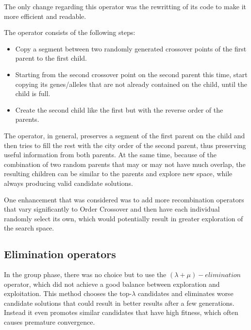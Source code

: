 \documentclass[a4paper,10pt]{article}
\newcommand{\ReplaceMe}[1]{{\color{blue}#1}}
\begin{document}
The only change regarding this operator was the rewritting of its code to make it more efficient and readable.

The operator consists of the following steps:
\begin{itemize}
\item Copy a segment between two randomly generated crossover points of the first parent to the first child.
\item Starting from the second crossover point on the second parent this time, start copying its genes/alleles that are not already contained on the child, until the child is full.
\item Create the second child like the first but with the reverse order of the parents.
\end{itemize}

The operator, in general, preserves a segment of the first parent on the child and then tries to fill the rest with the city order of the second parent, thus preserving useful information from both parents. At the same time, because of the combination of two random parents that may or may not have much overlap, the resulting children can be similar to the parents and explore new space, while always producing valid candidate solutions.

One enhancement that was considered was to add more recombination operators that vary significantly to Order Crossover and then have each individual randomly select its own, which would potentially result in greater exploration of the search space.

\subsection{Elimination operators} \label{ss_elim}


In the group phase, there was no choice but to use the $(\lambda+\mu)-elimination$ operator, which did not achieve a good balance between exploration and exploitation. This method chooses the top-$\lambda$ candidates and eliminates worse candidate solutions that could result in better results after a few generations. Instead it even promotes similar candidates that have high fitness, which often causes premature convergence.
\end{document}
